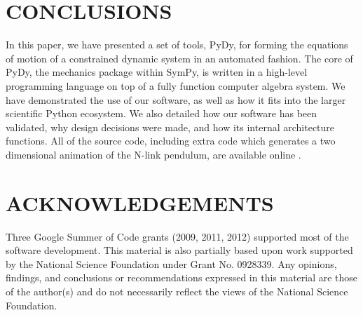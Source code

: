 \documentclass[twocolumn,10pt]{asme2e}
\begin{document}

\section*{CONCLUSIONS}
In this paper, we have presented a set of tools, PyDy, for forming the
equations of motion of a constrained dynamic system in an automated fashion.
The core of PyDy, the mechanics package within SymPy, is written in a
high-level programming language on top of a fully function computer algebra
system. We have demonstrated the use of our software, as well as how it fits
into the larger scientific Python ecosystem. We also detailed how our software
has been validated, why design decisions were made, and how its internal
architecture functions. All of the source code, including extra code which
generates a two dimensional animation of the N-link pendulum, are available
online \cite{SourceCode}.

\section*{ACKNOWLEDGEMENTS}
Three Google Summer of Code grants (2009, 2011, 2012) supported most of the
software development. This material is also partially based upon work supported
by the National Science Foundation under Grant No. 0928339. Any opinions,
findings, and conclusions or recommendations expressed in this material are
those of the author(s) and do not necessarily reflect the views of the National
Science Foundation.


\end{document}
